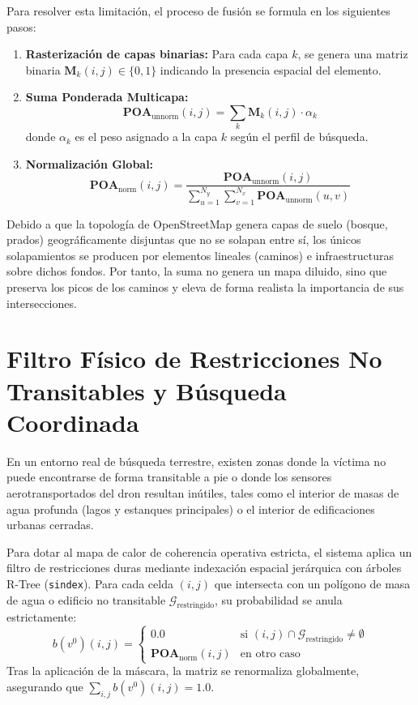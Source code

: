 Para resolver esta limitación, el proceso de fusión se formula en los siguientes pasos:
\begin{enumerate}
    \item \textbf{Rasterización de capas binarias:} Para cada capa $k$, se genera una matriz binaria $\mathbf{M}_k(i, j) \in \{0, 1\}$ indicando la presencia espacial del elemento.
    \item \textbf{Suma Ponderada Multicapa:}
    \begin{equation}
        \mathbf{POA}_{\text{unnorm}}(i, j) = \sum_{k} \mathbf{M}_k(i, j) \cdot \alpha_k
    \end{equation}
    donde $\alpha_k$ es el peso asignado a la capa $k$ según el perfil de búsqueda.
    \item \textbf{Normalización Global:}
    \begin{equation}
        \mathbf{POA}_{\text{norm}}(i, j) = \frac{\mathbf{POA}_{\text{unnorm}}(i, j)}{\sum_{u=1}^{N_y} \sum_{v=1}^{N_x} \mathbf{POA}_{\text{unnorm}}(u, v)}
    \end{equation}
\end{enumerate}

Debido a que la topología de OpenStreetMap genera capas de suelo (bosque, prados) geográficamente disjuntas que no se solapan entre sí, los únicos solapamientos se producen por elementos lineales (caminos) e infraestructuras sobre dichos fondos. Por tanto, la suma no genera un mapa diluido, sino que preserva los picos de los caminos y eleva de forma realista la importancia de sus intersecciones.

\section{Filtro Físico de Restricciones No Transitables y Búsqueda Coordinada}

En un entorno real de búsqueda terrestre, existen zonas donde la víctima no puede encontrarse de forma transitable a pie o donde los sensores aerotransportados del dron resultan inútiles, tales como el interior de masas de agua profunda (lagos y estanques principales) o el interior de edificaciones urbanas cerradas.

Para dotar al mapa de calor de coherencia operativa estricta, el sistema aplica un filtro de restricciones duras mediante indexación espacial jerárquica con árboles R-Tree (\texttt{sindex}). Para cada celda $(i, j)$ que intersecta con un polígono de masa de agua o edificio no transitable $\mathcal{G}_{\text{restringido}}$, su probabilidad se anula estrictamente:
\begin{equation}
    b(v^0)(i, j) = \begin{cases}
        0.0 & \text{si } (i, j) \cap \mathcal{G}_{\text{restringido}} \neq \emptyset \\
        \mathbf{POA}_{\text{norm}}(i, j) & \text{en otro caso}
    \end{cases}
\end{equation}
Tras la aplicación de la máscara, la matriz se renormaliza globalmente, asegurando que $\sum_{i,j} b(v^0)(i,j) = 1.0$.

